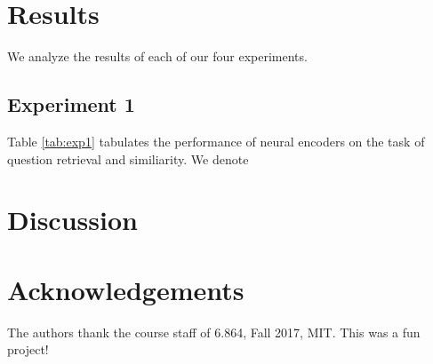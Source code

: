 \documentclass{sigkddExp}
\begin{document}
\section{Results}
We analyze the results of each of our four experiments.
\subsection{Experiment 1}
Table \ref{tab:exp1} tabulates the performance of neural encoders on the task of question retrieval and similiarity. We denote

\section{Discussion}
\label{discussion}

\section{Acknowledgements}
\label{ack}
The authors thank the course staff of 6.864, Fall 2017, MIT. This was a fun project!

%

%
%

\end{document}
